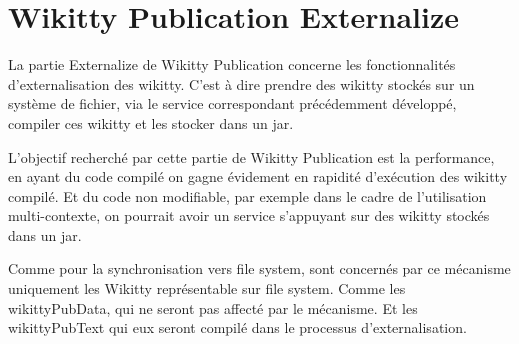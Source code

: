 


\section{Wikitty Publication Externalize}

La partie Externalize de Wikitty Publication concerne les fonctionnalités 
d'externalisation des wikitty. C'est à dire prendre des wikitty stockés sur un 
système de fichier, via le service correspondant précédemment développé, compiler
ces wikitty et les stocker dans un jar.

L'objectif recherché par cette partie de Wikitty Publication est la performance,
en ayant du code compilé on gagne évidement en rapidité d'exécution des wikitty
compilé. Et du code non modifiable, par exemple dans le cadre de l'utilisation 
multi-contexte, on pourrait avoir un service s'appuyant sur des wikitty stockés 
dans un jar.

Comme pour la synchronisation vers file system, sont concernés par ce mécanisme
uniquement les Wikitty représentable sur file system. Comme les wikittyPubData,
qui ne seront pas affecté par le mécanisme. Et les wikittyPubText qui eux seront
compilé dans le processus d'externalisation.

